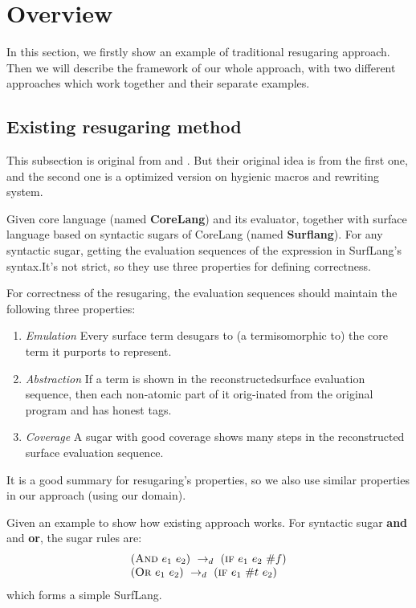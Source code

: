 \section{Overview}
\label{sec2}
In this section, we firstly show an example of traditional resugaring approach. Then we will describe the framework of our whole approach, with two different approaches which work together and their separate examples.
\subsection{Existing resugaring method}
This subsection is original from \cite{resugaring} and \cite{hygienic}. But their original idea is from the first one, and the second one is a optimized version on hygienic macros and rewriting system.
\begin{Def}[Resugaring]
Given core language (named {\bfseries CoreLang}) and its evaluator, together with surface language based on syntactic sugars of CoreLang (named {\bfseries Surflang}). For any syntactic sugar, getting the evaluation sequences of the expression in SurfLang's syntax.It's not strict, so they use three properties for defining correctness.
\end{Def}
For correctness of the resugaring, the evaluation sequences should maintain the following three properties:
\begin{enumerate}
\item \emph{Emulation} Every surface term desugars to (a termisomorphic to) the core term it purports to represent.
\item \emph{Abstraction} If a term is shown in the reconstructedsurface evaluation sequence, then each non-atomic part of it orig-inated from the original program and has honest tags.
\item \emph{Coverage}  A sugar with good coverage shows many steps in the reconstructed surface evaluation sequence.
\end{enumerate}
It is a good summary for resugaring's properties, so we also use similar properties in our approach (using our domain).

Given an example to show how existing approach works. For syntactic sugar {\bfseries and} and {\bfseries or}, the sugar rules are:
\[
\begin{array}{l}
(\mbox{\sc And}~e_1~e_2) ~\rightarrow_d~ (\mbox{\sc if}~e_1~e_2~\#f)\\
(\mbox{\sc Or}~e_1~e_2) ~\rightarrow_d~ (\mbox{\sc if}~e_1~\#t~e_2)
\end{array}
\]
which forms a simple SurfLang.

